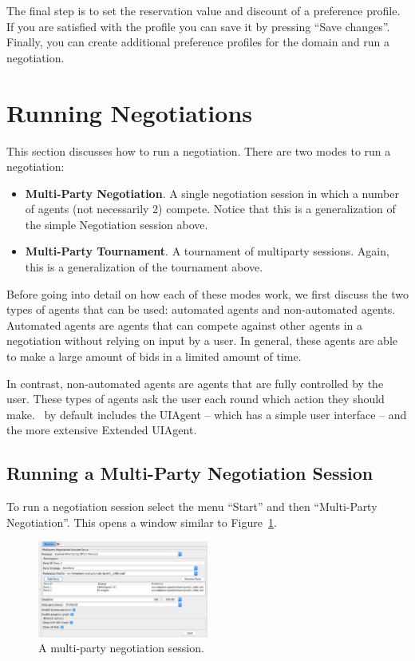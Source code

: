 \documentclass[]{article}
\begin{document}
The final step is to set the reservation value and discount of a preference profile. If you are satisfied with the profile you can save it by pressing ``Save changes''. Finally, you can create additional preference profiles for the domain and run a negotiation.


\section{Running Negotiations}
This section discusses how to run a negotiation. There are two modes to run a negotiation:

\begin{itemize}
	\item \textbf{Multi-Party Negotiation}. A single negotiation session in which a number of agents (not necessarily 2) compete. Notice that this is a generalization of the simple Negotiation session above.
	\item \textbf{Multi-Party Tournament}. A tournament of multiparty sessions. Again, this is a generalization of the tournament above.
	
\end{itemize}

Before going into detail on how each of these modes work, we first discuss the two types of agents that can be used: automated agents and non-automated agents. Automated agents are agents that can compete against other agents in a negotiation without relying on input by a user. In general, these agents are able to make a large amount of bids in a limited amount of time.

In contrast, non-automated agents are agents that are fully controlled by the user. These types of agents ask the user each round which action they should make. \Genius~by default includes the UIAgent -- which has a simple user interface -- and the more extensive Extended UIAgent.


\subsection{Running a Multi-Party Negotiation Session}\label{sec:singlesessionrun}
To run a negotiation session select the menu ``Start'' and then ``Multi-Party Negotiation''. This opens a window similar to Figure~\ref{Fig:multipartysession}. 

\begin{figure}[h!]
	\centering
	\includegraphics[width=0.5\textwidth]{media/multipartysession.png}
\caption{A multi-party negotiation session.}\label{Fig:multipartysession}
\end{figure}
\end{document}
